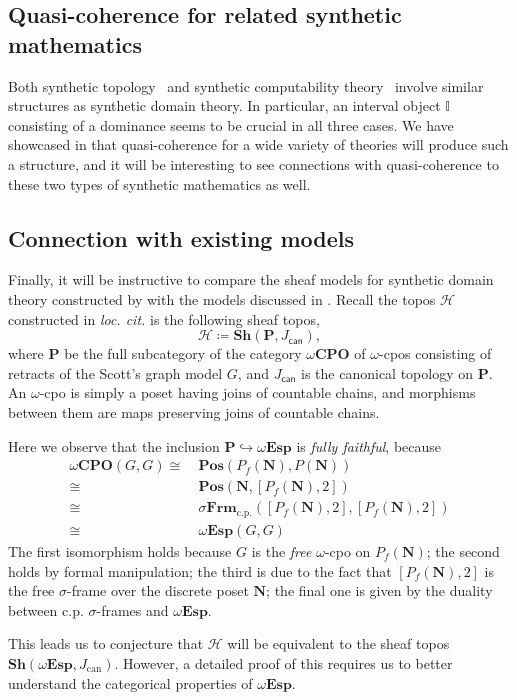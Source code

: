 \documentclass[12pt]{amsart}
\theoremstyle{definition}
\newcommand{\mc}[1]{\mathcal{#1}}
\newcommand{\mb}[1]{\mathbf{#1}}
\newcommand{\mbb}[1]{\mathbb{#1}}
\newcommand{\I}{\mbb I}
\newcommand{\mr}[1]{\mathrm{#1}}
\newcommand{\ms}[1]{\mathsf{#1}}
\newcommand{\Pos}{\mb{Pos}}
\newcommand{\sh}{\mb{Sh}}
\newcommand{\hook}{\hookrightarrow}
\newcommand{\cp}{_{\mr{c.p.}}}
\newcommand{\N}{\mb N}
\newcommand{\wCPO}{\omega\mb{CPO}}
\newcommand{\sFrm}{\sigma\mb{Frm}}
\newcommand{\wTop}{\omega\mb{Esp}}
\begin{document}

\subsection{Quasi-coherence for related synthetic mathematics}

Both synthetic topology~\cite{bauer2009dedekind} and synthetic computability theory~\cite{RN552} involve similar structures as synthetic domain theory. In particular, an interval object $\I$ consisting of a dominance seems to be crucial in all three cases. We have showcased in  that quasi-coherence for a wide variety of theories will produce such a structure, and it will be interesting to see connections with quasi-coherence to these two types of synthetic mathematics as well.

\subsection{Connection with existing models}\label{subsec:compare}

Finally, it will be instructive to compare the sheaf models for synthetic domain theory constructed by \citet{FIORE1997151} with the models discussed in . Recall the topos $\mc H$ constructed in \emph{loc. cit.} is the following sheaf topos,
\[ \mc H \coloneq \sh(\mb P,J_{\ms{can}}), \]
where $\mb P$ be the full subcategory of the category $\wCPO$ of $\omega$-cpos consisting of retracts of the Scott's graph model $G$, and $J_{\ms{can}}$ is the canonical topology on $\mb P$. An $\omega$-cpo is simply a poset having joins of countable chains, and morphisms between them are maps preserving joins of countable chains.

Here we observe that the inclusion $\mb P \hook \wTop$ is \emph{fully faithful}, because
\begin{align*}
  \wCPO(G,G)
  \cong\ & \Pos(P_f(\N),P(\N)) \\
  \cong\ & \Pos(\N,[P_f(\N),2]) \\
  \cong\ & \sFrm\cp([P_f(\N),2],[P_f(\N),2]) \\ 
  \cong\ & \wTop(G,G)
\end{align*}
The first isomorphism holds because $G$ is the \emph{free} $\omega$-cpo on $P_f(\N)$; the second holds by formal manipulation; the third is due to the fact that $[P_f(\N),2]$ is the free $\sigma$-frame over the discrete poset $\N$; the final one is given by the duality between c.p. $\sigma$-frames and $\wTop$. 

This leads us to conjecture that $\mc H$ will be equivalent to the sheaf topos $\sh(\wTop,J_{\mr{can}})$. However, a detailed proof of this requires us to better understand the categorical properties of $\wTop$.

 

\end{document}
